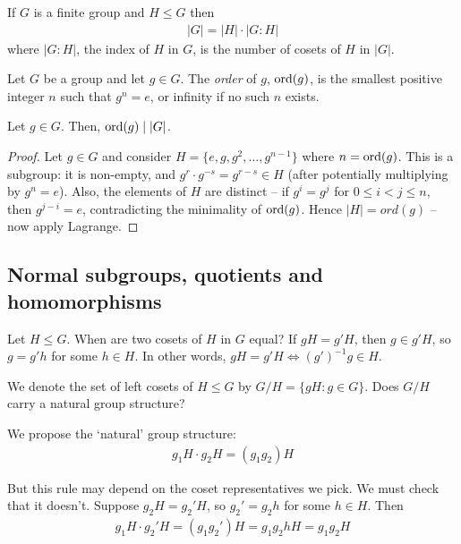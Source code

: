 \documentclass{../template/note}
\begin{document}
    \begin{theorem}[Lagrange]
        If $G$ is a finite group and $H \leq G$ then
        \begin{align*}
            |G| = |H| \cdot |G:H|
        \end{align*}
        where $|G:H|$, the index of $H$ in $G$, is the number of cosets of $H$ in $|G|$.
    \end{theorem}
    
    \begin{definition}
        Let $G$ be a group and let $g \in G$. The \emph{order} of $g$, $\operatorname{ord}(g)$, is the smallest positive integer $n$ such that $g^n = e$, or infinity if no such $n$ exists.
    \end{definition}
    
    \begin{proposition}
        Let $g \in G$. Then, $\operatorname{ord}(g) \mid |G|$.
    \end{proposition}
    
    \begin{proof}
        Let $g \in G$ and consider $H = \{e, g, g^2, \dots, g^{n-1}\}$ where $n = \operatorname{ord}(g)$. This is a subgroup: it is non-empty, and $g^r \cdot g^{-s} = g^{r-s} \in H$ (after potentially multiplying by $g^n = e$). Also, the elements of $H$ are distinct -- if $g^i = g^j$ for $0 \leq i < j \leq n$, then $g^{j-i} = e$, contradicting the minimality of $\operatorname{ord}(g)$. Hence $|H| = ord(g)$ -- now apply Lagrange.
    \end{proof}
    
    \subsection{Normal subgroups, quotients and homomorphisms}

    Let $H \leq G$. When are two cosets of $H$ in $G$ equal? If $gH = g'H$, then $g \in g'H$, so $g = g'h$ for some $h \in H$. In other words, $gH = g'H \iff (g')^{-1}g \in H$.

    We denote the set of left cosets of $H \leq G$ by $G/H = \{gH: g \in G\}$. Does $G/H$ carry a natural group structure?


    We propose the `natural' group structure:
    \begin{align*}
        g_1H \cdot g_2H = (g_1g_2)H
    \end{align*}
    
    But this rule may depend on the coset representatives we pick. We must check that it doesn't. Suppose $g_2H = g_2'H$, so $g_2' = g_2h$ for some $h \in H$. Then
    \begin{align*}
        g_1H \cdot g_2'H = (g_1g_2')H = g_1g_2hH = g_1g_2H
    \end{align*}
    
\end{document}

